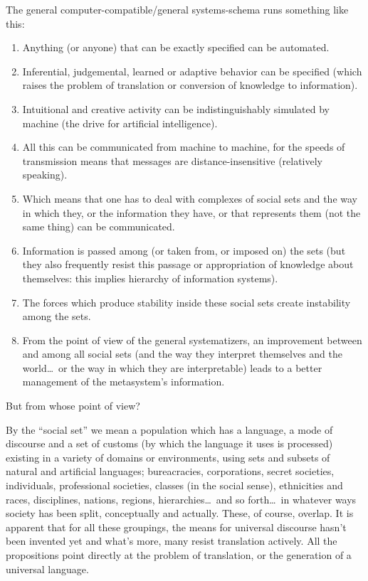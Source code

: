 The general computer-compatible\slash general systems-schema runs something like this:
\begin{enumerate}
	\item Anything (or anyone) that can be exactly specified can be automated.
	\item Inferential, judgemental, learned or adaptive behavior can be specified (which raises the problem of translation or conversion of knowledge to information).
	\item Intuitional and creative activity can be indistinguishably simulated by machine (the drive for artificial intelligence).
	\item All this can be communicated from machine to machine, for the speeds of transmission means that messages are distance-insensitive (relatively speaking).
	\item Which means that one has to deal with complexes of social sets and the way in which they, or the information they have, or that represents them (not the same thing) can be communicated.
	\item Information is passed among (or taken from, or imposed on) the sets (but they also frequently resist this passage or appropriation of knowledge about themselves: this implies hierarchy of information systems).
	\item The forces which produce stability inside these social sets create instability among the sets.
	\item From the point of view of the general systematizers, an improvement between and among all social sets (and the way they interpret themselves and the world\ldots\ or the way in which they are interpretable) leads to a better management of the metasystem's information.
\end{enumerate}

But from whose point of view?

By the \enquote{social set} we mean a population which has a language, a mode of discourse and a set of customs (by which the language it uses is processed) existing in a variety of domains or environments, using sets and subsets of natural and artificial languages; bureacracies, corporations, secret societies, individuals, professional societies, classes (in the social sense), ethnicities and races, disciplines, nations, regions, hierarchies\ldots\ and so forth\ldots\ in whatever ways society has been split, conceptually and actually. These, of course, overlap. It is apparent that for all these groupings, the means for universal discourse hasn't been invented yet and what's more, many resist translation actively. All the propositions point directly at the problem of translation, or the generation of a universal language.

